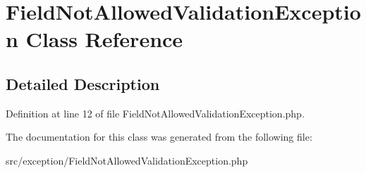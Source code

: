 \hypertarget{classcommon_1_1user_1_1exception_1_1_field_not_allowed_validation_exception}{\section{\-Field\-Not\-Allowed\-Validation\-Exception \-Class \-Reference}
\label{classcommon_1_1user_1_1exception_1_1_field_not_allowed_validation_exception}
}


\subsection{\-Detailed \-Description}


\-Definition at line 12 of file \-Field\-Not\-Allowed\-Validation\-Exception.\-php.



\-The documentation for this class was generated from the following file\-:\begin{DoxyCompactItemize}
\item 
src/exception/\-Field\-Not\-Allowed\-Validation\-Exception.\-php\end{DoxyCompactItemize}
